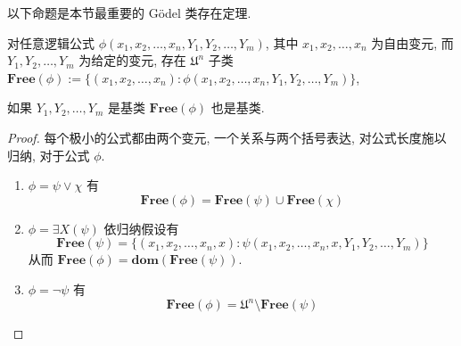 以下命题是本节最重要的 Gödel 类存在定理.

\begin{theorem}[Gödel, 1940]
    \label {theorem:Gödel class existence}
    对任意逻辑公式 \(\phi(x_1, x_2, \dots, x_n, Y_1, Y_2, \dots, Y_m)\), 其中 \(x_1, x_2, \dots, x_n\) 为自由变元,
    而 \(Y_1, Y_2, \dots, Y_m\) 为给定的变元, 存在 \(\mathfrak{U}^n\) 子类 \(\mathbf{Free} (\phi) := \{(x_1, x_2, \dots, x_n) : \phi(x_1, x_2, \dots, x_n, Y_1, Y_2, \dots, Y_m)\}\),
    
    如果 \(Y_1, Y_2, \dots, Y_m\) 是基类 \(\mathbf{Free} (\phi)\) 也是基类.

    \begin{proof}
        每个极小的公式都由两个变元, 一个关系与两个括号表达, 对公式长度施以归纳, 对于公式 \(\phi\).

        \begin{enumerate}
            \item \(\phi = \psi \lor \chi\) 有 
            \[
                \mathbf{Free} (\phi) = \mathbf{Free} (\psi) \cup \mathbf{Free} (\chi)
            \]
            \item \(\phi = \exists X (\psi)\) 依归纳假设有
            \[
                \mathbf{Free} (\psi) = \{(x_1, x_2, \dots, x_n, x) : \psi(x_1, x_2, \dots, x_n, x, Y_1, Y_2, \dots, Y_m)\}
            \]
            从而 \(\mathbf{Free} (\phi) = \mathbf{dom} (\mathbf{Free} (\psi))\).
            \item \(\phi = \neg \psi\) 有
            \[
                \mathbf{Free} (\phi) = \mathfrak{U}^n \setminus \mathbf{Free} (\psi)
            \]
        \end{enumerate}
    \end{proof}
\end{theorem}

